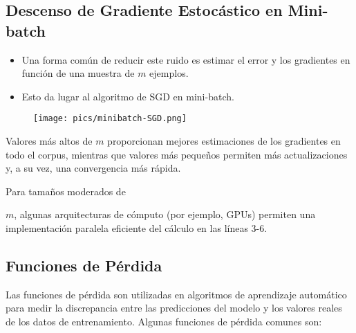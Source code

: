 \subsection{Descenso de Gradiente Estocástico en Mini-batch}
\begin{itemize}
\item Una forma común de reducir este ruido es estimar el error y los gradientes en función de una muestra de $m$ ejemplos.
\item Esto da lugar al algoritmo de SGD en mini-batch.
\end{itemize}

\begin{figure}[htb]
	\centering
	 \texttt{[image: pics/minibatch-SGD.png]}
\end{figure}

Valores más altos de $m$ proporcionan mejores estimaciones de los gradientes en todo el corpus, mientras que valores más pequeños permiten más actualizaciones y, a su vez, una convergencia más rápida.

Para tamaños moderados de

$m$, algunas arquitecturas de cómputo (por ejemplo, GPUs) permiten una implementación paralela eficiente del cálculo en las líneas 3-6.



\subsection{Funciones de Pérdida}
Las funciones de pérdida son utilizadas en algoritmos de aprendizaje automático para medir la discrepancia entre las predicciones del modelo y los valores reales de los datos de entrenamiento. Algunas funciones de pérdida comunes son:

